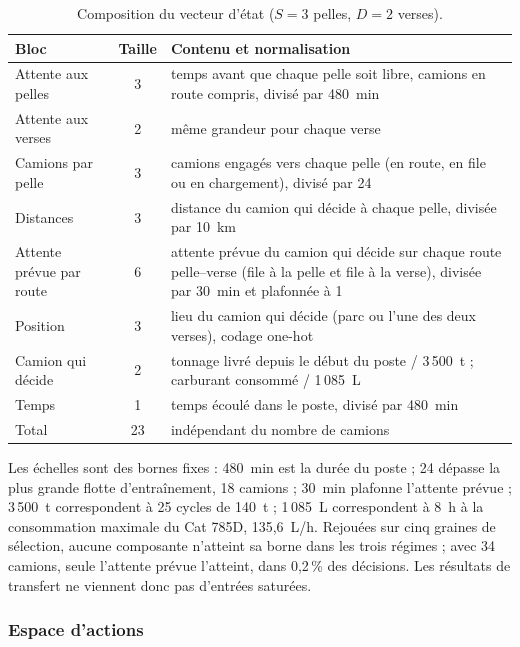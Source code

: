 \documentclass[11pt,a4paper]{article}
\newif\ifrevmarks
\newcommand{\revtag}[1]{\ifrevmarks\textsuperscript{\textcolor{red!70!black}{\scriptsize[#1]}}\fi}
\newcommand{\rev}[2]{\ifrevmarks{\color{revcolor}#2}\revtag{#1}\else#2\fi}
\newif\ifcorrmarks
\newcommand{\corr}[1]{\ifcorrmarks\textcolor{corrcolor}{#1}\else#1\fi}
\begin{document}
\begin{table}[H]
\centering
\caption{\rev{M1, N1, N2, v3}{Composition du vecteur d'état ($S = 3$ pelles, $D = 2$ verses).}}
\label{tab:state}
\footnotesize
\begin{tabularx}{\textwidth}{lcX}
\toprule
\textbf{Bloc} & \textbf{Taille} & \textbf{Contenu et normalisation} \\
\midrule
Attente aux pelles & 3 & temps avant que chaque pelle soit libre, camions en route compris, divisé par 480~min \\
Attente aux verses & 2 & même grandeur pour chaque verse \\
Camions par pelle & 3 & camions engagés vers chaque pelle (en route, en file ou en chargement), divisé par 24 \\
Distances & 3 & distance du camion qui décide à chaque pelle, divisée par 10~km \\
Attente prévue par route & 6 & attente prévue du camion qui décide sur chaque route pelle--verse (file à la pelle et file à la verse), divisée par 30~min et plafonnée à 1 \\
Position & 3 & lieu du camion qui décide (parc ou l'une des deux verses), codage one-hot \\
Camion qui décide & 2 & tonnage livré depuis le début du poste / 3\,500~t ; carburant consommé / 1\,085~L \\
Temps & 1 & temps écoulé dans le poste, divisé par 480~min \\
\midrule
Total & 23 & indépendant du nombre de camions \\
\bottomrule
\end{tabularx}
\end{table}

\corr{Les échelles sont des bornes fixes : 480~min est la durée du poste ; 24 dépasse la plus grande flotte d'entraînement, 18 camions ; 30~min plafonne l'attente prévue ; 3\,500~t correspondent à 25 cycles de 140~t ; 1\,085~L correspondent à 8~h à la consommation maximale du Cat 785D, 135,6~L/h. Rejouées sur cinq graines de sélection, aucune composante n'atteint sa borne dans les trois régimes ; avec 34 camions, seule l'attente prévue l'atteint, dans 0,2\,\% des décisions. Les résultats de transfert ne viennent donc pas d'entrées saturées.}


\subsubsection{Espace d'actions}
\end{document}
